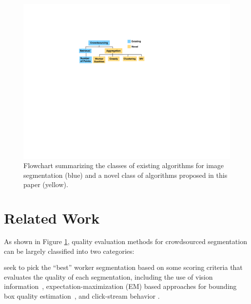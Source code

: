 \begin{figure}[h!]
\centering
\includegraphics[width=0.75\linewidth]{plots/flowchart.pdf}
\caption{Flowchart summarizing the classes of existing algorithms for image segmentation (blue) and a novel class of algorithms proposed in this paper (yellow).} %
\label{flowchart}
\setlength{\belowcaptionskip}{-15pt}
\setlength{\abovecaptionskip}{-5pt} 
\vspace{-10pt}
\end{figure}
\section{Related Work\label{sec:related}}
As shown in Figure \ref{flowchart}, quality evaluation methods for crowdsourced segmentation can be largely classified into two categories:

 seek to pick the ``best'' worker segmentation based on some scoring criteria that evaluates the quality of each segmentation, including the use of vision information~\cite{Vittayakorn2011,Russakovsky2015}, expectation-maximization (EM) based approaches for bounding box quality estimation~\cite{OCWelinder2010}, and click-stream behavior \cite{Cabezas2015,Sameki2015,Sorokin2008}.

